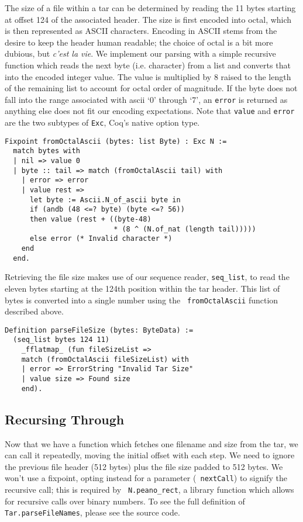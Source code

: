 \documentclass[nocopyrightspace]{sigplanconf}
\begin{document}
The size of a file within a tar can be determined by reading the 11 bytes
starting at offset 124 of the associated header. The size is first encoded into
octal, which is then represented as ASCII characters. Encoding in ASCII stems
from the desire to keep the header human readable; the choice of octal is a
bit more dubious, but {\it c'est la vie}. We implement our parsing with a
simple recursive function which reads the next byte (i.e. character) from a
list and converts that into the encoded integer value. The value is multiplied
by 8 raised to the length of the remaining list to account for octal order of
magnitude. If the byte does not fall into the range associated with ascii `0'
through `7', an {\tt error} is returned as anything else does not fit our
encoding expectations. Note that {\tt value} and {\tt error} are the two
subtypes of {\tt Exc}, Coq's native option type.

\begin{lstlisting}
Fixpoint fromOctalAscii (bytes: list Byte) : Exc N :=
  match bytes with
  | nil => value 0
  | byte :: tail => match (fromOctalAscii tail) with
    | error => error
    | value rest => 
      let byte := Ascii.N_of_ascii byte in
      if (andb (48 <=? byte) (byte <=? 56))
      then value (rest + ((byte-48)
                          * (8 ^ (N.of_nat (length tail)))))
      else error (* Invalid character *)
    end
  end.
\end{lstlisting}

Retrieving the file size makes use of our sequence reader, {\tt seq\_list}, to
read the eleven bytes starting at the 124th position within the tar header.
This list of bytes is converted into a single number using the {\tt
fromOctalAscii} function described above.

\begin{lstlisting}
Definition parseFileSize (bytes: ByteData) :=
  (seq_list bytes 124 11)
    _fflatmap_ (fun fileSizeList =>
    match (fromOctalAscii fileSizeList) with
    | error => ErrorString "Invalid Tar Size"
    | value size => Found size
    end).
\end{lstlisting}

\subsection{Recursing Through}

Now that we have a function which fetches one filename and size from the tar,
we can call it repeatedly, moving the initial offset with each step.  We need
to ignore the previous file header (512 bytes) plus the file size padded to
512 bytes. We won't use a fixpoint, opting instead for a parameter ({\tt
nextCall}) to signify the recursive call; this is required by {\tt
N.peano\_rect}, a library function which allows for recursive calls over
binary numbers. To see the full definition of {\tt Tar.parseFileNames}, please
see the source code.
\end{document}
